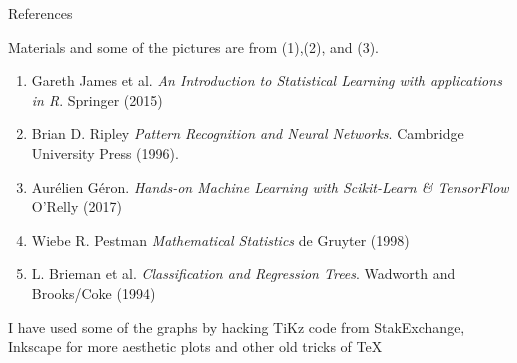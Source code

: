 \documentclass{beamer}
\begin{document}
\begin{frame}{References}

Materials and some of the pictures are from (1),(2), and (3).
\begin{enumerate}
	\item Gareth James et al. {\it An Introduction to Statistical Learning with applications in R}. Springer (2015)
	\item Brian D. Ripley {\it Pattern Recognition and Neural Networks}. Cambridge University Press (1996). 
	\item Aur\'elien G\'eron. {\it Hands-on Machine Learning with Scikit-Learn \& TensorFlow} O'Relly (2017)
	\item Wiebe R. Pestman {\it Mathematical Statistics} de Gruyter (1998)
	\item L. Brieman et al. {\it Classification and Regression Trees}. Wadworth and Brooks/Coke (1994)
	
\end{enumerate}	

I have used some of the graphs by hacking TiKz code from StakExchange, Inkscape for more aesthetic plots and other old tricks of \TeX
\end{frame}	
\end{document}
